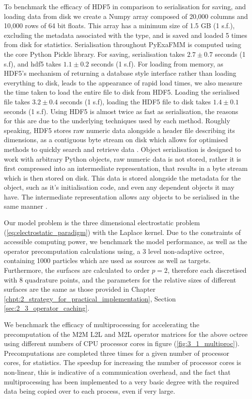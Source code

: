 To benchmark the efficacy of HDF5 in comparison to serialisation for saving,
and loading data from disk we create a Numpy array composed of
20,000 columns and 10,000 rows of 64 bit floats. This array has a minimum size
of 1.5 GB (1 s.f.), excluding the metadata associated with the type, and is
saved and loaded 5 times from disk for statistics. Serialisation throughout
\gls{PyExaFMM} is computed using the core Python Pickle library. For saving,
serialisation takes $2.7 \pm 0.7$ seconds (1 s.f), and hdf5 takes $1.1 ± 0.2$ seconds (1 s.f).
For loading from memory, as HDF5's mechanism of returning a database style interface
rather than loading everything to disk, leads to the appearance of rapid
load times, we also measure the time taken to load the entire file to disk from
HDF5. Loading the serialised file takes $3.2 \pm 0.4$ seconds (1 s.f), loading
the HDF5 file to disk takes $1.4 \pm 0.1$ seconds (1 s.f). Using HDF5 is almost
twice as fast as serialisation, the reasons for this are due to the underlying
techniques used by each method. Roughly speaking, HDF5 stores raw numeric data
alongside a header file describing its dimensions, as a contiguous byte stream
on disk which allows for optimised methods to quickly search and retrieve data
\cite{collette2013python}. Object serialisation is designed to work with arbitrary
Python objects, raw numeric data is not stored, rather it is first compressed
into an intermediate representation, that results in a byte stream which is then
stored on disk. This data is stored alongside the metadata for the object, such
as it's initialisation code, and even any dependent objects it may have. The
intermediate representation allows any objects to be serialised in the same
manner \cite{pickle}.

Our model problem is the three dimensional electrostatic problem (\ref{eq:electrostatic_paradigm})
with the Laplace kernel. Due to the constraints of accessible computing power,
we benchmark the model performance, as well as the operator precomputation
calculations using, a 3 level non-adaptive octree, containing 1000 particles which
are used as sources as well as targets. Furthermore, the surfaces are calculated
to order $p=2$, therefore each discretised with $8$ quadrature points, and the
parameters for the relative sizes of different surfaces are the same as those
provided in Chapter \ref{chpt:2_strategy_for_practical_implementation}, Section
\ref{sec:2_3_operator_caching}.

We benchmark the efficacy of multiprocessing for accelerating the precomputation
of the \gls{M2M} \gls{L2L} and \gls{M2L} operator matrices for the above octree
using different numbers of CPU processor cores in figure (\ref{fig:3_1_multiproc}).
Precomputations are completed three times for a given number of processor cores,
for statistics. The speedup for increasing the number of processor cores is non-linear, this is
indicative of a communication overhead, and the fact that multiprocessing has
been implemented to a very basic degree with the required data being copied
over to each process, even if very large.



